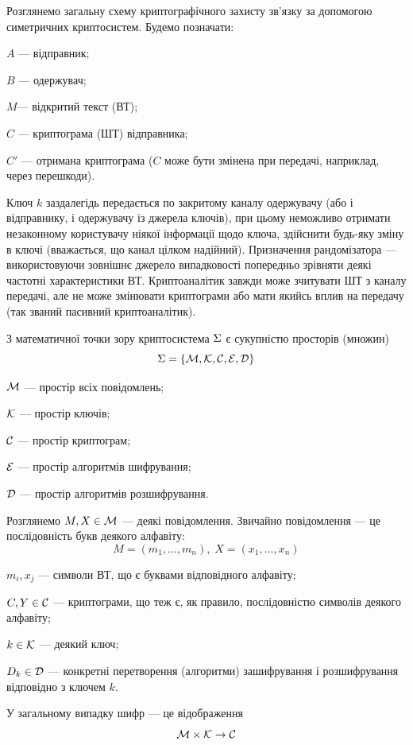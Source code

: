 Розглянемо загальну схему криптографічного захисту зв’язку за допомогою
симетричних криптосистем. Будемо позначати:

$A$ --- відправник;

$B$ --- одержувач;

$M$--- відкритий текст (ВТ);

$C$ --- криптограма (ШТ) відправника;

$C'$ --- отримана криптограма ($C$ може бути змінена при передачі,
наприклад, через перешкоди).

Ключ $k$ заздалегідь передається по закритому
каналу одержувачу (або і відправнику, і одержувачу із джерела ключів), при
цьому неможливо отримати незаконному користувачу ніякої інформації щодо ключа,
здійснити будь-яку зміну в ключі  (вважається, що канал цілком надійний).
Призначення рандомізатора --- використовуючи  зовнішнє джерело випадковості
попередньо зрівняти деякі частотні характеристики ВТ.  Криптоаналітик завжди
може зчитувати ШТ з каналу передачі, але не може змінювати криптограми або мати
якийсь вплив на передачу (так званий пасивний криптоаналітик).

З математичної точки зору криптосистема $\Sigma$ є сукупністю просторів
(множин)
$$\Sigma
    = \left\{ \mathcal{M}, \mathcal{K}, \mathcal{C},
        \mathcal{E}, \mathcal{D} \right\}$$

$\mathcal{M}$ --- простір всіх повідомлень; $ $

$\mathcal{K}$ --- простір ключів;

$\mathcal{C}$ --- простір криптограм;

$\mathcal{E}$ --- простір алгоритмів шифрування;

$\mathcal{D}$ --- простір алгоритмів розшифрування.

Розглянемо  $M, X \in \mathcal{M}$ --- деякі повідомлення.
Звичайно повідомлення --- це послідовність букв  деякого алфавіту:
$$M = \left( m_1, \dots, m_n \right),\; X = \left( x_1, \dots, x_n \right)$$

$m_i,x_j$ --- символи ВТ, що є буквами відповідного алфавіту;

$C, Y \in \mathcal{C}$ --- криптограми, що теж є, як правило, послідовністю
символів деякого алфавіту; 

$k \in \mathcal{K}$ --- деякий ключ; 

$D_k \in \mathcal{D}$ --- конкретні перетворення (алгоритми) зашифрування і
розшифрування відповідно з ключем $k$. 

У загальному випадку шифр --- це відображення
$$\mathcal{M} \times \mathcal{K} \rightarrow \mathcal{C}$$

